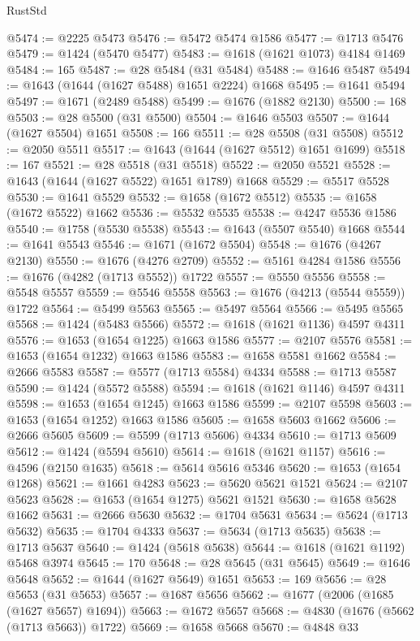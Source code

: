 \begin{lexlean}{RustStd}
\begin{coremodule}
@5474 := @2225 @5473
@5476 := @5472 @5474 @1586
@5477 := @1713 @5476
@5479 := @1424 (@5470 @5477)
@5483 := @1618 (@1621 @1073) @4184 @1469
@5484 := 165
@5487 := @28 @5484 (@31 @5484)
@5488 := @1646 @5487
@5494 := @1643 (@1644 (@1627 @5488) @1651 @2224) @1668
@5495 := @1641 @5494
@5497 := @1671 (@2489 @5488)
@5499 := @1676 (@1882 @2130)
@5500 := 168
@5503 := @28 @5500 (@31 @5500)
@5504 := @1646 @5503
@5507 := @1644 (@1627 @5504) @1651
@5508 := 166
@5511 := @28 @5508 (@31 @5508)
@5512 := @2050 @5511
@5517 := @1643 (@1644 (@1627 @5512) @1651 @1699)
@5518 := 167
@5521 := @28 @5518 (@31 @5518)
@5522 := @2050 @5521
@5528 := @1643 (@1644 (@1627 @5522) @1651 @1789) @1668
@5529 := @5517 @5528
@5530 := @1641 @5529
@5532 := @1658 (@1672 @5512)
@5535 := @1658 (@1672 @5522) @1662
@5536 := @5532 @5535
@5538 := @4247 @5536 @1586
@5540 := @1758 (@5530 @5538)
@5543 := @1643 (@5507 @5540) @1668
@5544 := @1641 @5543
@5546 := @1671 (@1672 @5504)
@5548 := @1676 (@4267 @2130)
@5550 := @1676 (@4276 @2709)
@5552 := @5161 @4284 @1586
@5556 := @1676 (@4282 (@1713 @5552)) @1722
@5557 := @5550 @5556
@5558 := @5548 @5557
@5559 := @5546 @5558
@5563 := @1676 (@4213 (@5544 @5559)) @1722
@5564 := @5499 @5563
@5565 := @5497 @5564
@5566 := @5495 @5565
@5568 := @1424 (@5483 @5566)
@5572 := @1618 (@1621 @1136) @4597 @4311
@5576 := @1653 (@1654 @1225) @1663 @1586
@5577 := @2107 @5576
@5581 := @1653 (@1654 @1232) @1663 @1586
@5583 := @1658 @5581 @1662
@5584 := @2666 @5583
@5587 := @5577 (@1713 @5584) @4334
@5588 := @1713 @5587
@5590 := @1424 (@5572 @5588)
@5594 := @1618 (@1621 @1146) @4597 @4311
@5598 := @1653 (@1654 @1245) @1663 @1586
@5599 := @2107 @5598
@5603 := @1653 (@1654 @1252) @1663 @1586
@5605 := @1658 @5603 @1662
@5606 := @2666 @5605
@5609 := @5599 (@1713 @5606) @4334
@5610 := @1713 @5609
@5612 := @1424 (@5594 @5610)
@5614 := @1618 (@1621 @1157)
@5616 := @4596 (@2150 @1635)
@5618 := @5614 @5616 @5346
@5620 := @1653 (@1654 @1268)
@5621 := @1661 @4283
@5623 := @5620 @5621 @1521
@5624 := @2107 @5623
@5628 := @1653 (@1654 @1275) @5621 @1521
@5630 := @1658 @5628 @1662
@5631 := @2666 @5630
@5632 := @1704 @5631
@5634 := @5624 (@1713 @5632)
@5635 := @1704 @4333
@5637 := @5634 (@1713 @5635)
@5638 := @1713 @5637
@5640 := @1424 (@5618 @5638)
@5644 := @1618 (@1621 @1192) @5468 @3974
@5645 := 170
@5648 := @28 @5645 (@31 @5645)
@5649 := @1646 @5648
@5652 := @1644 (@1627 @5649) @1651
@5653 := 169
@5656 := @28 @5653 (@31 @5653)
@5657 := @1687 @5656
@5662 := @1677 (@2006 (@1685 (@1627 @5657) @1694))
@5663 := @1672 @5657
@5668 := @4830 (@1676 (@5662 (@1713 @5663)) @1722)
@5669 := @1658 @5668
@5670 := @4848 @33

\end{coremodule}
\end{lexlean}
